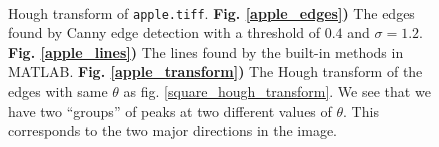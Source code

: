 \documentclass[a4paper, 10pt, final]{article}
\begin{document}
\begin{figure}[!h]
    \centering
    \hspace{1em}
    \\
    \caption[]{
    Hough transform of \texttt{apple.tiff}.
    \textbf{Fig. \ref{apple_edges})} The edges found by Canny edge
    detection with a threshold of $0.4$ and $\sigma = 1.2$.
    \textbf{Fig. \ref{apple_lines})} The lines found by the built-in
    methods in MATLAB.
    \textbf{Fig. \ref{apple_transform})} The Hough transform of the
    edges with same $\theta$ as fig. \ref{square_hough_transform}. We
    see that we have two ``groups'' of peaks at two different values of
    $\theta$. This corresponds to the two major directions in the image.
    }
    \label{apple_hough_transform}
\end{figure}
\end{document}
